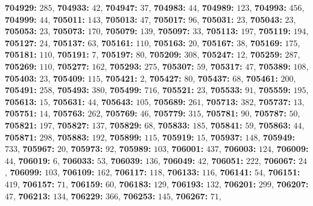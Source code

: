 \textsf{\bfseries 704929:} $285$, \textsf{\bfseries 704933:} $42$, \textsf{\bfseries 704947:} $37$, \textsf{\bfseries 704983:} $44$, \textsf{\bfseries 704989:} $123$, \textsf{\bfseries 704993:} $456$, \textsf{\bfseries 704999:} $44$, \textsf{\bfseries 705011:} $143$, \textsf{\bfseries 705013:} $47$, \textsf{\bfseries 705017:} $96$, \textsf{\bfseries 705031:} $23$, \textsf{\bfseries 705043:} $23$, \textsf{\bfseries 705053:} $23$, \textsf{\bfseries 705073:} $170$, \textsf{\bfseries 705079:} $139$, \textsf{\bfseries 705097:} $33$, \textsf{\bfseries 705113:} $197$, \textsf{\bfseries 705119:} $194$, \textsf{\bfseries 705127:} $24$, \textsf{\bfseries 705137:} $63$, \textsf{\bfseries 705161:} $110$, \textsf{\bfseries 705163:} $20$, \textsf{\bfseries 705167:} $38$, \textsf{\bfseries 705169:} $175$, \textsf{\bfseries 705181:} $110$, \textsf{\bfseries 705191:} $7$, \textsf{\bfseries 705197:} $80$, \textsf{\bfseries 705209:} $308$, \textsf{\bfseries 705247:} $12$, \textsf{\bfseries 705259:} $287$, \textsf{\bfseries 705269:} $110$, \textsf{\bfseries 705277:} $162$, \textsf{\bfseries 705293:} $275$, \textsf{\bfseries 705307:} $59$, \textsf{\bfseries 705317:} $47$, \textsf{\bfseries 705389:} $108$, \textsf{\bfseries 705403:} $23$, \textsf{\bfseries 705409:} $115$, \textsf{\bfseries 705421:} $2$, \textsf{\bfseries 705427:} $80$, \textsf{\bfseries 705437:} $68$, \textsf{\bfseries 705461:} $200$, \textsf{\bfseries 705491:} $258$, \textsf{\bfseries 705493:} $380$, \textsf{\bfseries 705499:} $716$, \textsf{\bfseries 705521:} $23$, \textsf{\bfseries 705533:} $91$, \textsf{\bfseries 705559:} $195$, \textsf{\bfseries 705613:} $15$, \textsf{\bfseries 705631:} $44$, \textsf{\bfseries 705643:} $105$, \textsf{\bfseries 705689:} $261$, \textsf{\bfseries 705713:} $382$, \textsf{\bfseries 705737:} $13$, \textsf{\bfseries 705751:} $14$, \textsf{\bfseries 705763:} $262$, \textsf{\bfseries 705769:} $46$, \textsf{\bfseries 705779:} $315$, \textsf{\bfseries 705781:} $90$, \textsf{\bfseries 705787:} $50$, \textsf{\bfseries 705821:} $197$, \textsf{\bfseries 705827:} $137$, \textsf{\bfseries 705829:} $68$, \textsf{\bfseries 705833:} $185$, \textsf{\bfseries 705841:} $59$, \textsf{\bfseries 705863:} $44$, \textsf{\bfseries 705871:} $298$, \textsf{\bfseries 705883:} $192$, \textsf{\bfseries 705899:} $115$, \textsf{\bfseries 705919:} $15$, \textsf{\bfseries 705937:} $148$, \textsf{\bfseries 705949:} $733$, \textsf{\bfseries 705967:} $20$, \textsf{\bfseries 705973:} $92$, \textsf{\bfseries 705989:} $103$, \textsf{\bfseries 706001:} $437$, \textsf{\bfseries 706003:} $124$, \textsf{\bfseries 706009:} $44$, \textsf{\bfseries 706019:} $6$, \textsf{\bfseries 706033:} $53$, \textsf{\bfseries 706039:} $136$, \textsf{\bfseries 706049:} $42$, \textsf{\bfseries 706051:} $222$, \textsf{\bfseries 706067:} $24$, \textsf{\bfseries 706099:} $103$, \textsf{\bfseries 706109:} $162$, \textsf{\bfseries 706117:} $118$, \textsf{\bfseries 706133:} $116$, \textsf{\bfseries 706141:} $54$, \textsf{\bfseries 706151:} $419$, \textsf{\bfseries 706157:} $71$, \textsf{\bfseries 706159:} $60$, \textsf{\bfseries 706183:} $129$, \textsf{\bfseries 706193:} $132$, \textsf{\bfseries 706201:} $299$, \textsf{\bfseries 706207:} $47$, \textsf{\bfseries 706213:} $134$, \textsf{\bfseries 706229:} $366$, \textsf{\bfseries 706253:} $145$, \textsf{\bfseries 706267:} $71$, 

